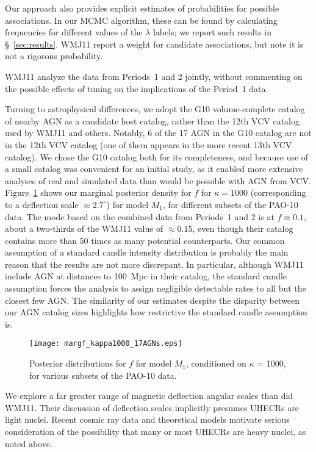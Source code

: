 Our approach also provides explicit estimates of probabilities for possible
associations.  In our MCMC algorithm, these can be found by calculating
frequencies for different values of the $\lambda$ labels; we report
such results in \S~\ref{sec:results}.  WMJ11 report a weight for
candidate associations, but note it is not a rigorous probability.

WMJ11 analyze the data from Periods~1 and 2 jointly, without commenting on the
possible effects of tuning on the implications of the Period~1 data.

Turning to astrophysical differences, we adopt the G10
\cite{2010MNRAS.406..597G} volume-complete catalog of nearby AGN as a
candidate host catalog, rather than the 12th VCV catalog used by WMJ11 and
others.  Notably, 6 of the 17 AGN in the G10 catalog are not in the 12th VCV
catalog (one of them appears in the more recent 13th VCV catalog).  We chose
the G10 catalog both for its completeness, and because use of a small
catalog was convenient for an initial study, as it enabled more extensive
analyses of real and simulated data than would be possible with AGN from
VCV. Figure~\ref{fig:f1000} shows our marginal posterior density for $f$ for
$\kappa = 1000$ (corresponding to a deflection scale $\approx 2.7^\circ$)
for model $M_1$, for different subsets of the PAO-10 data. The mode based on
the combined data from Periods~1 and 2 is at $f \approx 0.1$, about a
two-thirds of the WMJ11 value of $\approx 0.15$, even though their catalog
contains more than 50 times as many potential counterparts.  Our common
assumption of a standard candle intensity distribution is probably the main
reason that the results are not more discrepant. In particular, although
WMJ11 include AGN at distances to 100~Mpc in their catalog, the standard
candle assumption forces the analysis to assign negligible detectable rates
to all but the closest few AGN.  The similarity of our estimates despite the
disparity between our AGN catalog sizes highlights how restrictive the
standard candle assumption is.

\begin{figure}
\centerline{\texttt{[image: margf\_kappa1000\_17AGNs.eps]}}
\caption{Posterior distributions for $f$ for model $M_1$, conditioned on
$\kappa$ = 1000, for various subsets of the PAO-10 data.}
\label{fig:f1000}
\end{figure}

We explore a far greater range of magnetic deflection angular scales
than did WMJ11.  Their discussion of deflection scales implicitly
presumes UHECRs are light nuclei.  Recent cosmic ray data and
theoretical models motivate serious consideration of the possibility
that many or most UHECRs are heavy nuclei, as noted above.

